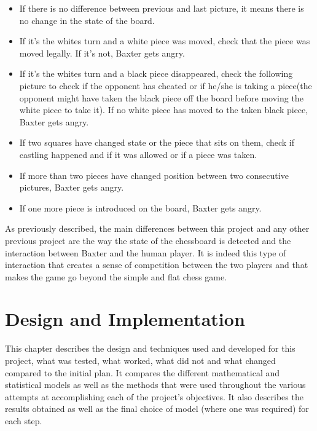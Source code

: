\documentclass{l4proj}
\begin{document}
\begin{itemize}


	\item If there is no difference between previous and last picture, it means there is no change in the state of the board.
	
	\item If it's the whites turn and a white piece was moved, check that the piece was moved legally. If it's not, Baxter gets angry.

	\item If it's the whites turn and a black piece disappeared, check the following picture to check if the opponent has cheated or if he/she is taking a piece(the opponent might have taken the black piece off the board before moving the white piece to take it). If no white piece has moved to the taken black piece, Baxter gets angry.

	\item If two squares have changed state or the piece that sits on them, check if castling happened and if it was allowed or if a piece was taken.

	\item If more than two pieces have changed position between two consecutive pictures, Baxter gets angry.

	\item If one more piece is introduced on the board, Baxter gets angry.


\end{itemize}

As previously described, the main differences between this project and any other previous project are the way the state of the chessboard is detected and the interaction between Baxter and the human player. It is indeed this type of interaction that creates a sense of competition between the two players and that makes the game go beyond the simple and flat chess game.


\chapter{Design and Implementation} \label{DesAndImpl}

This chapter describes the design and techniques used and developed for this project, what was tested, what worked, what did not and what changed compared to the initial plan. It compares the different mathematical and statistical models as well as the methods that were used throughout the various attempts at accomplishing each of the project's objectives. It also describes the results obtained as well as the final choice of model (where one was required) for each step.
\end{document}
